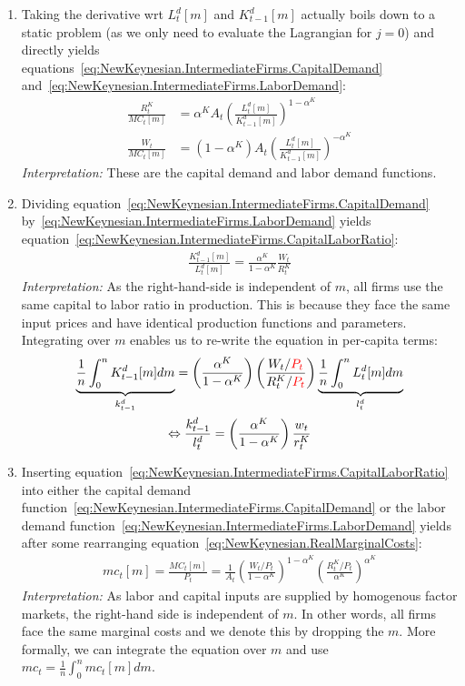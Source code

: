 \begin{enumerate}
\item
Taking the derivative wrt \(L^{d}_{t}[m]\) and \(K^{d}_{t-1}[m]\) actually boils down to a static problem
  (as we only need to evaluate the Lagrangian for \(j=0\))
  and directly yields equations~\eqref{eq:NewKeynesian.IntermediateFirms.CapitalDemand} and~\eqref{eq:NewKeynesian.IntermediateFirms.LaborDemand}:
\begin{align*}
\frac{R^{K}_{t}}{{MC}_{t}[m]} &= \alpha^{K} A_{t} {\left(\frac{L^{d}_{t}[m]}{K^{d}_{t-1}[m]}\right)}^{1-\alpha^{K}}
\\
\frac{W_{t}}{{MC}_{t}[m]} &= (1-\alpha^{K}) A_{t} {\left(\frac{L^{d}_{t}[m]}{K^{d}_{t-1}[m]}\right)}^{-\alpha^{K}}
\end{align*}
\emph{Interpretation:} These are the capital demand and labor demand functions.

\item
Dividing equation~\eqref{eq:NewKeynesian.IntermediateFirms.CapitalDemand} by~\eqref{eq:NewKeynesian.IntermediateFirms.LaborDemand}
  yields equation~\eqref{eq:NewKeynesian.IntermediateFirms.CapitalLaborRatio}:
\begin{align*}
\frac{K^{d}_{t-1}[m]}{L^{d}_{t}[m]} = \frac{\alpha^{K}}{1-\alpha^{K}} \frac{W_{t}}{R^K_{t}}
\end{align*}
\emph{Interpretation:} As the right-hand-side is independent of \(m\), all firms use the same capital to labor ratio in production.
This is because they face the same input prices and have identical production functions and parameters.
Integrating over \(m\) enables us to re-write the equation in per-capita terms:
\begin{gather*}
\underbrace{\frac{1}{n} \int_{0}^{n} K^{d}_{t-1}[m] dm}_{k^{d}_{t-1}}
= \left(\frac{\alpha^{K}}{1-\alpha^{K}}\right) \left(\frac{W_{t}/{\color{red}P_{t}}}{R^{K}_{t}/{\color{red}P_{t}}}\right)
\underbrace{\frac{1}{n} \int_{0}^{n} L^{d}_{t}[m] dm}_{l^{d}_{t}}
\\
\Leftrightarrow
\frac{k^{d}_{t-1}}{l^{d}_{t}} = \left(\frac{\alpha^{K}}{1-\alpha^{K}}\right) \frac{w_{t}}{r^{K}_{t}}
\end{gather*}

\item
Inserting equation~\eqref{eq:NewKeynesian.IntermediateFirms.CapitalLaborRatio} into
  either the capital demand function~\eqref{eq:NewKeynesian.IntermediateFirms.CapitalDemand}
  or the labor demand function~\eqref{eq:NewKeynesian.IntermediateFirms.LaborDemand}
  yields after some rearranging equation~\eqref{eq:NewKeynesian.RealMarginalCosts}:
\begin{align*}
{mc}_{t}[m] = \frac{{MC}_{t}[m]}{P_{t}} =  \frac{1}{A_{t}} {\left(\frac{W_{t}/P_{t}}{1-\alpha^{K}}\right)}^{1-\alpha^{K}} {\left(\frac{R^{K}_{t}/P_{t}}{\alpha^{K}}\right)}^{\alpha^{K}}
\end{align*}
\emph{Interpretation:} As labor and capital inputs are supplied by homogenous factor markets,
  the right-hand side is independent of \(m\).
In other words, all firms face the same marginal costs and we denote this by dropping the \(m\).
More formally, we can integrate the equation over \(m\) and use \({mc}_{t} = \frac{1}{n} \int_{0}^{n} {mc}_{t}[m]dm\).
	


\end{enumerate}
